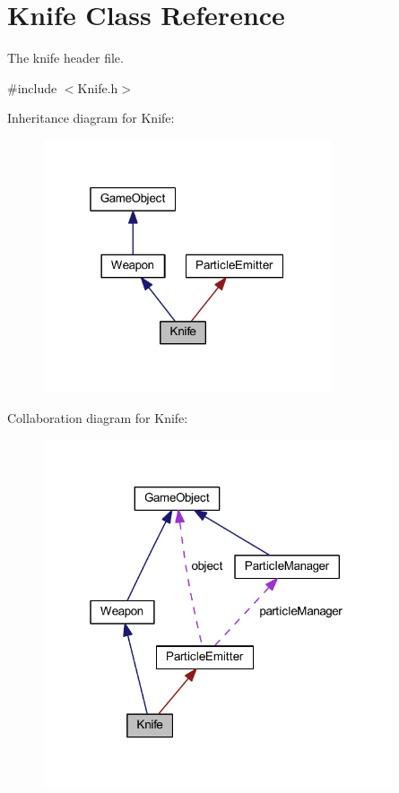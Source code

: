 \hypertarget{class_knife}{\section{Knife Class Reference}
\label{class_knife}
}


The knife header file.  




{\ttfamily \#include $<$Knife.\+h$>$}



Inheritance diagram for Knife\+:\nopagebreak
\begin{figure}[H]
\begin{center}
\leavevmode
\includegraphics[width=241pt]{class_knife__inherit__graph}
\end{center}
\end{figure}


Collaboration diagram for Knife\+:\nopagebreak
\begin{figure}[H]
\begin{center}
\leavevmode
\includegraphics[width=292pt]{class_knife__coll__graph}
\end{center}
\end{figure}
